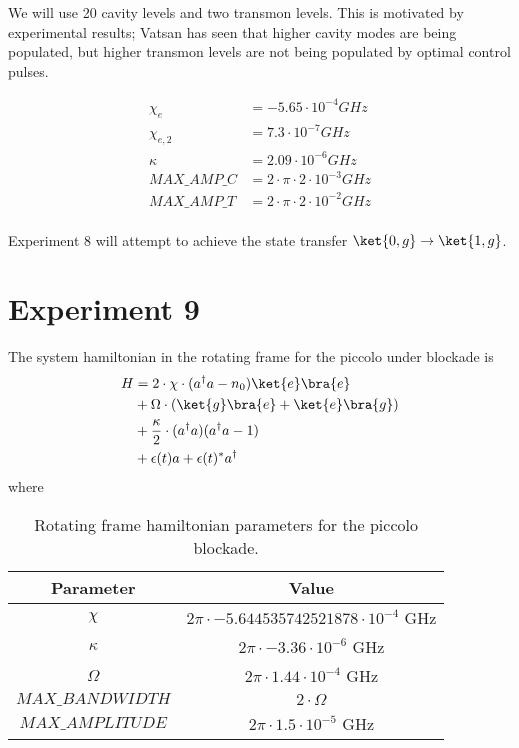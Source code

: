 \documentclass[letterpaper, 12pt]{article}
\begin{document}
We will use 20 cavity levels and two transmon levels. This is motivated by experimental results; Vatsan has seen that higher cavity modes are being populated, but higher transmon levels are not being populated by optimal control pulses.

\begin{align*}
  \chi_{e} &= -5.65 \cdot 10^{-4} GHz\\
  \chi_{e, 2} &= 7.3 \cdot 10^{-7} GHz\\
  \kappa &= 2.09 \cdot 10^{-6} GHz\\
  MAX\_AMP\_C &= 2 \cdot \pi \cdot 2 \cdot 10^{-3} GHz\\
  MAX\_AMP\_T &= 2 \cdot \pi \cdot 2 \cdot 10^{-2} GHz\\
\end{align*}

Experiment 8 will attempt to achieve the state transfer $\ket{0, g} \rightarrow \ket{1, g}$.

\section{Experiment 9}
The system hamiltonian in the rotating frame for the piccolo under blockade is
\begin{align*}
  H &= 2 \cdot \chi \cdot (a^{\dagger}a - n_{0}) \ket{e} \bra{e}\\
  &+ \Omega \cdot (\ket{g} \bra{e} + \ket{e} \bra{g})\\
  &+ \frac{\kappa}{2} \cdot (a^{\dagger}a)(a^{\dagger}a - 1)\\
  &+ \epsilon(t)a + \epsilon(t)^{*}a^{\dagger}
\end{align*}
where
\begin{table}[H]
  \begin{center}
    \begin{tabular}{c | c}
      Parameter & Value\\
      \hline
      $\chi$          & $2 \pi \cdot -5.644535742521878 \cdot 10^{-4}$ GHz\\
      $\kappa$        & $2 \pi \cdot -3.36 \cdot 10^{-6}$ GHz\\
      $\Omega$        & $2 \pi \cdot 1.44 \cdot 10^{-4}$ GHz\\
      $MAX\_BANDWIDTH$ & $2 \cdot \Omega$\\
      $MAX\_AMPLITUDE$ & $2 \pi \cdot 1.5 \cdot 10^{-5}$ GHz\\
    \end{tabular}
  \end{center}
  \caption{Rotating frame hamiltonian parameters for the piccolo blockade.}
\end{table}
\end{document}
